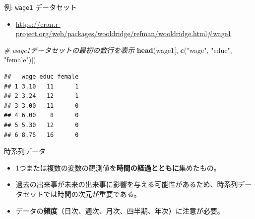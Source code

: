 \documentclass[
  ignorenonframetext,
]{beamer}
\newenvironment{Shaded}{\begin{snugshade}}{\end{snugshade}}
\newcommand{\CommentTok}[1]{\textcolor[rgb]{0.56,0.35,0.01}{\textit{#1}}}
\newcommand{\FunctionTok}[1]{\textcolor[rgb]{0.13,0.29,0.53}{\textbf{#1}}}
\newcommand{\NormalTok}[1]{#1}
\newcommand{\StringTok}[1]{\textcolor[rgb]{0.31,0.60,0.02}{#1}}
\providecommand{\tightlist}{%
  \setlength{\itemsep}{0pt}\setlength{\parskip}{0pt}}
\begin{document}
\begin{frame}[fragile]{例: \texttt{wage1} データセット}
\label{ux4f8b-wage1-ux30c7ux30fcux30bfux30bbux30c3ux30c8}
\begin{itemize}
\tightlist
\item
  \url{https://cran.r-project.org/web/packages/wooldridge/refman/wooldridge.html\#wage1}
\end{itemize}

\begin{Shaded}
\begin{Highlighting}[]
\CommentTok{\# wage1データセットの最初の数行を表示}
\FunctionTok{head}\NormalTok{(wage1[, }\FunctionTok{c}\NormalTok{(}\StringTok{"wage"}\NormalTok{, }\StringTok{"educ"}\NormalTok{, }\StringTok{"female"}\NormalTok{)])}
\end{Highlighting}
\end{Shaded}

\begin{verbatim}
##   wage educ female
## 1 3.10   11      1
## 2 3.24   12      1
## 3 3.00   11      0
## 4 6.00    8      0
## 5 5.30   12      0
## 6 8.75   16      0
\end{verbatim}
\end{frame}

\begin{frame}{時系列データ}
\label{ux6642ux7cfbux5217ux30c7ux30fcux30bf}
\begin{itemize}
\tightlist
\item
  1つまたは複数の変数の観測値を\textbf{時間の経過とともに}集めたもの。
\item
  過去の出来事が未来の出来事に影響を与える可能性があるため、時系列データセットでは時間の次元が重要である。
\item
  データの\textbf{頻度}（日次、週次、月次、四半期、年次）に注意が必要。
\end{itemize}
\end{frame}
\end{document}
